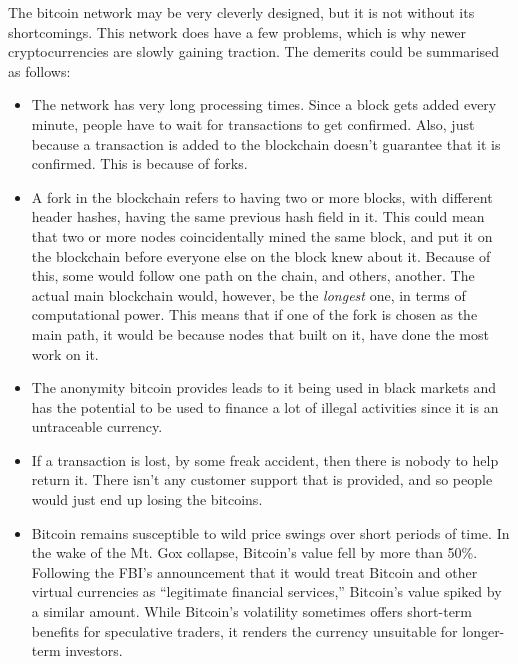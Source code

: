 \documentclass[12pt,a4paper]{report}
\begin{document}
\begin{justify}
The bitcoin network may be very cleverly designed, but it is not without its shortcomings. This network does have a few problems, which is why newer cryptocurrencies are slowly gaining traction. The demerits could be summarised as follows: 
\begin{itemize}
    \item The network has very long processing times. Since a block gets added every minute, people have to wait for transactions to get confirmed. Also, just because a transaction is added to the blockchain doesn't guarantee that it is confirmed. This is because of forks.
    \item A fork in the blockchain refers to having two or more blocks, with different header hashes, having the same previous hash field in it. This could mean that two or more nodes coincidentally mined the same block, and put it on the blockchain before everyone else on the block knew about it.\newline
    Because of this, some would follow one path on the chain, and others, another. The actual main blockchain would, however, be the \textit{longest} one, in terms of computational power. This means that if one of the fork is chosen as the main path, it would be because nodes that built on it, have done the most work on it.
    \item The anonymity bitcoin provides leads to it being used in black markets and has the potential to be used to finance a lot of illegal activities since it is an untraceable currency.
    \item If a transaction is lost, by some freak accident, then there is nobody to help return it. There isn't any customer support that is provided, and so people would just end up losing the bitcoins.
    \item Bitcoin remains susceptible to wild price swings over short periods of time. In the wake of the Mt. Gox collapse, Bitcoin’s value fell by more than 50\%. Following the FBI’s announcement that it would treat Bitcoin and other virtual currencies as “legitimate financial services,” Bitcoin’s value spiked by a similar amount. While Bitcoin’s volatility sometimes offers short-term benefits for speculative traders, it renders the currency unsuitable for longer-term investors.
\end{itemize}


\end{justify}
\end{document}
